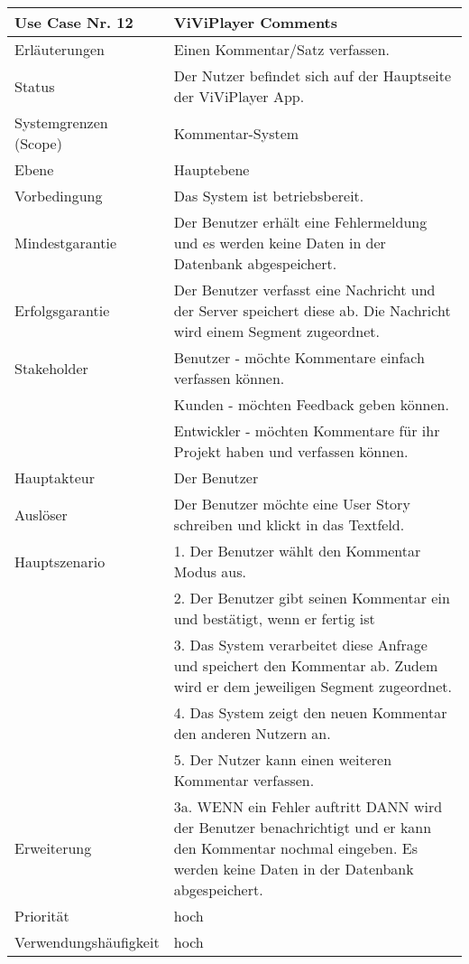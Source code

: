 \begin{tabularx}{\linewidth}{|l|X|}
	\hline
	Use Case Nr. 12			& \textbf{ViViPlayer Comments} \\ \hline
	Erläuterungen			&  Einen Kommentar/Satz verfassen. \\ \hline
	Status					&  Der Nutzer befindet sich auf der Hauptseite der ViViPlayer App. \\ \hline
	Systemgrenzen (Scope)	&  Kommentar-System\\ \hline
	Ebene					&  Hauptebene\\ \hline
	Vorbedingung			&  Das System ist betriebsbereit.\\ \hline
	Mindestgarantie			&  Der Benutzer erhält eine Fehlermeldung und es werden keine Daten in der Datenbank abgespeichert.\\ \hline
	Erfolgsgarantie			&  Der Benutzer verfasst eine Nachricht und der Server speichert diese ab. Die Nachricht wird einem Segment zugeordnet.\\ \hline
	Stakeholder				&  Benutzer - möchte Kommentare einfach verfassen können.\\ 
                            &  Kunden - möchten Feedback geben können. \\
                            &   Entwickler - möchten Kommentare für ihr Projekt haben und verfassen können. \\ \hline
	Hauptakteur				&  Der Benutzer\\ \hline
	Auslöser				&  Der Benutzer möchte eine User Story schreiben und klickt in das Textfeld. \\ \hline	
	Hauptszenario			&  1. Der Benutzer wählt den Kommentar Modus aus. \\
                            &  2. Der Benutzer gibt seinen Kommentar ein und bestätigt, wenn er fertig ist\\
							&  3. Das System verarbeitet diese Anfrage und speichert den Kommentar ab. Zudem wird er dem jeweiligen Segment zugeordnet. \\
							&  4. Das System zeigt den neuen Kommentar den anderen Nutzern an.\\
							&  5. Der Nutzer kann einen weiteren Kommentar verfassen. \\ \hline
	Erweiterung				& 3a. WENN ein Fehler auftritt DANN wird der Benutzer benachrichtigt und er kann den Kommentar nochmal eingeben. Es werden keine Daten in der Datenbank abgespeichert.\\ \hline
	Priorität				&  hoch \\ \hline
	Verwendungshäufigkeit	&  hoch \\ \hline
\end{tabularx}
